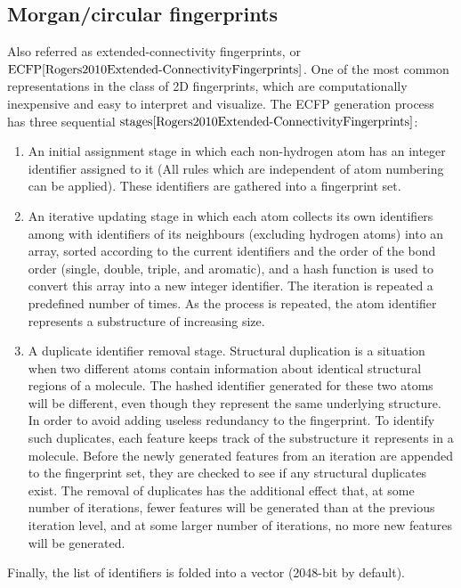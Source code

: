\subsection{Morgan/circular fingerprints}
Also referred as extended-connectivity fingerprints, or $\text{ECFP}{\cite{Rogers2010Extended-ConnectivityFingerprints}}$.
One of the most common representations in the class of 2D fingerprints, which are 
computationally inexpensive and easy to interpret and visualize.
The ECFP generation process has three sequential $\text{stages}{\cite{Rogers2010Extended-ConnectivityFingerprints}}$:
\begin{enumerate}
    \item An initial assignment stage in which each non-hydrogen atom has an integer identifier assigned to it (All rules which are independent of atom numbering can be applied).
    These identifiers are gathered into a fingerprint set. 
    \item An iterative updating stage in which each atom collects its own identifiers among with identifiers of its neighbours (excluding hydrogen atoms) into an array, sorted according to the current identifiers and the order of the bond order (single, double, triple, and aromatic), and a hash function is used to convert this array into a new integer identifier.
    The iteration is repeated a predefined number of times. As the process is repeated, 
the atom identifier represents a
    substructure of increasing size.
    \item A duplicate identifier removal stage. Structural duplication is a situation when two different atoms contain information about identical structural regions of a molecule.
    The hashed identifier generated for these two atoms will be different, even 
though they represent the same underlying structure.
    In order to avoid adding useless redundancy to the fingerprint.
    To identify such duplicates, each feature keeps track of the substructure it 
represents in a molecule.
    Before the newly generated features from an iteration are appended to the fingerprint 
set, they are checked to see if any structural duplicates exist.
    The removal of duplicates has the additional effect that, at some number of 
iterations, fewer features will be generated than at the previous iteration level, 
and at some larger number of iterations, no more new features will be generated.
\end{enumerate}
    Finally, the list of identifiers is folded into a vector (2048-bit by default).
\hfill\break\\
